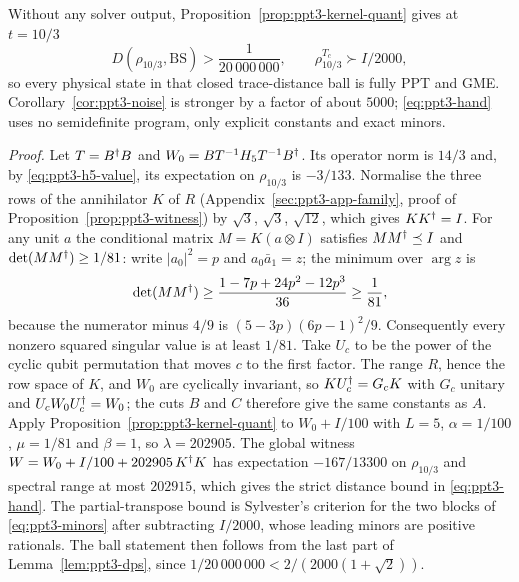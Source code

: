 \begin{remark}\label{rem:ppt3-hand-radius}
Without any solver output, Proposition~\ref{prop:ppt3-kernel-quant} gives at $t=10/3$
\begin{equation}\label{eq:ppt3-hand}
D(\rho_{10/3},\mathrm{BS})>\frac1{20\,000\,000},\qquad
\rho_{10/3}^{T_c}\succ I/2000,
\end{equation}
so every physical state in that closed trace-distance ball is fully PPT and GME. Corollary~\ref{cor:ppt3-noise} is stronger
by a factor of about $5000$; \eqref{eq:ppt3-hand} uses no semidefinite
program, only explicit constants and exact minors.

\emph{Proof.} Let $T=B^{\dagger} B$ and $W_0=BT^{-1}H_5T^{-1}B^{\dagger}$. Its operator norm is $14/3$ and, by
\eqref{eq:ppt3-h5-value}, its expectation on $\rho_{10/3}$ is $-3/133$. Normalise the three rows of the annihilator $K$ of
$R$ (Appendix~\ref{sec:ppt3-app-family}, proof of Proposition~\ref{prop:ppt3-witness}) by $\sqrt3$, $\sqrt3$, $\sqrt{12}$, which gives $KK^{\dagger}=I$. For any unit $a$ the
conditional matrix $M=K(a\otimes I)$ satisfies $MM^{\dagger}\preceq I$ and $\det(MM^{\dagger})\ge1/81$: write $|a_0|^2=p$ and
$a_0\bar a_1=z$; the minimum over $\arg z$ is
\[
\det(MM^{\dagger})\ge\frac{1-7p+24p^2-12p^3}{36}\ge\frac1{81},
\]
because the numerator minus $4/9$ is $(5-3p)(6p-1)^2/9$. Consequently every nonzero squared singular value is at least
$1/81$. Take $U_c$ to be the power of the cyclic qubit permutation that moves $c$ to the first factor. The range $R$, hence
the row space of $K$, and $W_0$ are cyclically invariant, so $KU_c^{\dagger}=G_cK$ with $G_c$ unitary and $U_cW_0U_c^{\dagger}=W_0$; the
cuts $B$ and $C$ therefore give the same constants as $A$. Apply Proposition~\ref{prop:ppt3-kernel-quant} to $W_0+I/100$ with $L=5$, $\alpha=1/100$, $\mu=1/81$ and
$\beta=1$, so $\lambda=202905$. The global witness $W=W_0+I/100+202905\,K^{\dagger} K$ has expectation $-167/13300$ on
$\rho_{10/3}$ and spectral range at most $202915$, which gives the strict distance bound in \eqref{eq:ppt3-hand}. The
partial-transpose bound is Sylvester's criterion for the two blocks of \eqref{eq:ppt3-minors} after subtracting $I/2000$,
whose leading minors are positive rationals. The ball statement then follows from the last part of
Lemma~\ref{lem:ppt3-dps}, since $1/20\,000\,000<2/(2000(1+\sqrt2))$.
\end{remark}
